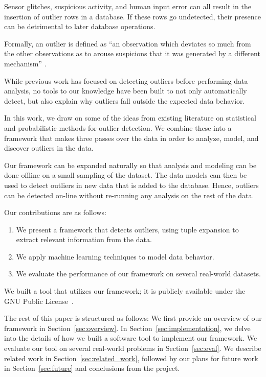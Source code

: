 
Sensor glitches, suspicious activity, and human input error can all result in the insertion of outlier rows in a database. If these rows go undetected, their presence can be detrimental to later database operations.

Formally, an outlier is defined as “an observation which deviates so much from the other observations as to arouse suspicions that it was generated by a different mechanism” \cite{Hawkins1980}.

While previous work has focused on detecting outliers before performing data analysis, no tools to our knowledge have been built to not only automatically detect, but also explain why outliers fall outside the expected data behavior.

In this work, we draw on some of the ideas from existing literature on statistical and probabilistic methods for outlier detection. We combine these into a framework that makes three passes over the data in order to analyze, model, and discover outliers in the data.

Our framework can be expanded naturally so that analysis and modeling can be done offline on a small sampling of the dataset. The data models can then be used to detect outliers in new data that is added to the database. Hence, outliers can be detected on-line without re-running any analysis on the rest of the data.

Our contributions are as follows:
\begin{enumerate}
\item We present a framework that detects outliers, using tuple expansion to extract relevant information from the data.
\item We apply machine learning techniques to model data behavior.
\item We evaluate the performance of our framework on several real-world datasets.
\end{enumerate}

We built a tool that utilizes our framework; it is publicly available under the GNU Public License~\cite{github}.

The rest of this paper is structured as follows:
We first provide an overview of our framework in Section~\ref{sec:overview}.
In Section~\ref{sec:implementation}, we delve into the details of how we built a software tool to implement our framework.
We evaluate our tool on several real-world problems in Section~\ref{sec:eval}.
We describe related work in Section~\ref{sec:related_work}, followed by our plans for future work in Section~\ref{sec:future} and conclusions from the project.
